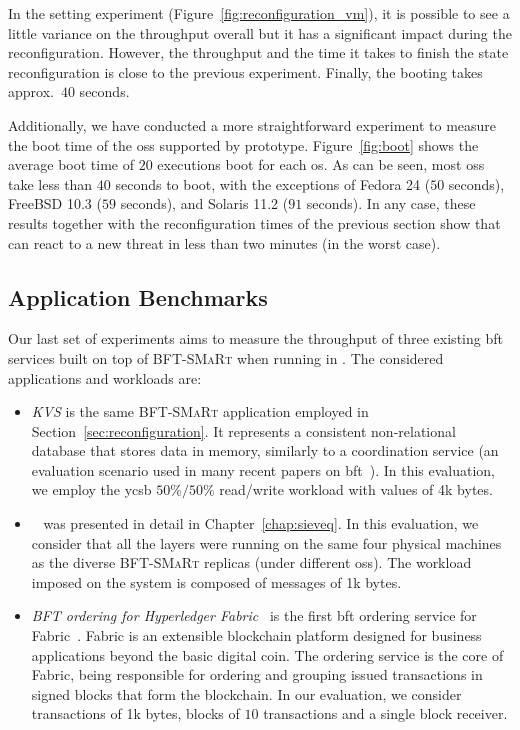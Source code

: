 In the \system setting experiment (Figure~\ref{fig:reconfiguration_vm}), it is possible to see a little variance on the throughput overall but it has a significant impact during the reconfiguration. 
However, the throughput and the time it takes to finish the state reconfiguration is close to the previous experiment.
Finally, the booting takes approx.~$40$ seconds.

Additionally, we have conducted a more straightforward experiment to measure the boot time of the \glspl{os} supported by \system prototype. 
Figure~\ref{fig:boot} shows the average boot time of $20$ executions boot for each \gls{os}.
As can be seen, most \glspl{os} take less than $40$ seconds to boot, with the exceptions of Fedora 24 ($50$ seconds), FreeBSD 10.3 ($59$ seconds), and Solaris 11.2 ($91$ seconds).
In any case, these results together with the reconfiguration times of the previous section show that \system can react to a new threat in less than two minutes (in the worst case).
\subsection{Application Benchmarks}
Our last set of experiments aims to measure the throughput of three existing \gls{bft} services built on top of \textsc{BFT-SMaRt} when running in \system.
The considered applications and workloads are:

\begin{itemize}

\item \emph{KVS} is the same \textsc{BFT-SMaRt} application employed in Section~\ref{sec:reconfiguration}.
It represents a consistent non-relational database that stores data in memory, similarly to a coordination service (an evaluation scenario used in many recent papers on \gls{bft}~\cite{Liu:2016,Behl:2017}).
In this evaluation, we employ the \gls{ycsb} $50\%/50\%$ read/write workload with values of 4k bytes.

\item \sieveq~\cite{Garcia:2016} was presented in detail in Chapter~\ref{chap:sieveq}. In this evaluation, we consider that all the layers were running on the same four physical machines as the diverse \textsc{BFT-SMaRt} replicas (under different \glspl{os}).
The workload imposed on the system is composed of messages of 1k bytes.

\item \emph{BFT ordering for Hyperledger Fabric}~\cite{Sousa:2018} is the first \gls{bft} ordering service for Fabric~\cite{Androulaki:2018}. 
Fabric is an extensible blockchain platform designed for business applications beyond the basic digital coin.
The ordering service is the core of Fabric, being responsible for ordering and grouping issued transactions in signed blocks that form the blockchain.
In our evaluation, we consider transactions of 1k bytes, blocks of $10$ transactions and a single block receiver.

\end{itemize}

